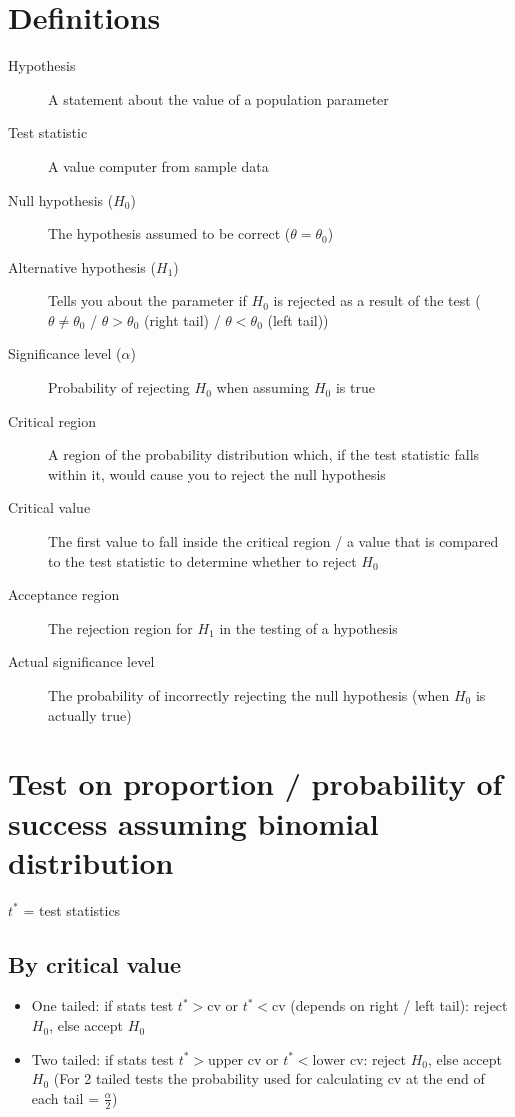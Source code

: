 \section{Definitions}
\begin{description}
    \item[Hypothesis] A statement about the value of a population parameter
    \item[Test statistic] A value computer from sample data
    \item[Null hypothesis ($H_0$)] The hypothesis assumed to be correct ($\theta=\theta_0$)
    \item[Alternative hypothesis ($H_1$)] Tells you about the parameter if $H_0$ is rejected as a result of the test ($\theta \neq \theta_0$ / $\theta>\theta_0$ (right tail) / $\theta<\theta_0$ (left tail))
    \item[Significance level ($\alpha$)] Probability of rejecting $H_0$ when assuming $H_0$ is true
    \item[Critical region] A region of the probability distribution which, if the test statistic falls within it, would cause you to reject the null hypothesis
    \item[Critical value] The first value to fall inside the critical region / a value that is compared to the test statistic to determine whether to reject $H_0$
    \item[Acceptance region] The rejection region for $H_1$ in the testing of a hypothesis
    \item[Actual significance level] The probability of incorrectly rejecting the null hypothesis (when $H_0$ is actually true)
\end{description}

\section{Test on proportion / probability of success assuming binomial distribution}
$t^*$ = test statistics
\subsection{By critical value}
\begin{itemize}
    \item One tailed: if stats test $t^* > \text{cv}$ or $t^* < \text{cv}$ (depends on right / left tail): reject $H_0$, else accept $H_0$
    \item Two tailed: if stats test $t^* > \text{upper cv}$ or $t^* < \text{lower cv}$: reject $H_0$, else accept $H_0$ (For 2 tailed tests the probability used for calculating cv at the end of each tail = $\frac{\alpha}{2}$)
\end{itemize}


